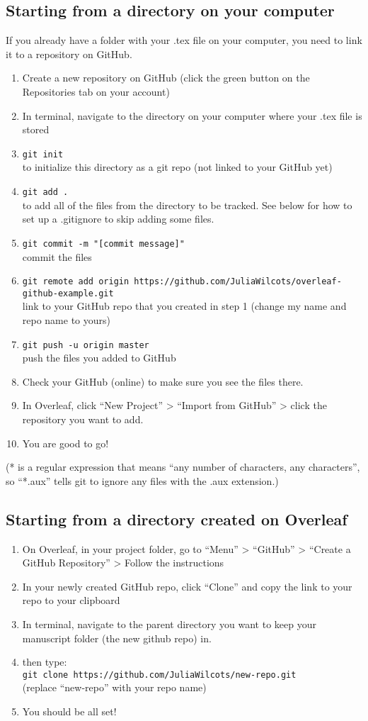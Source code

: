 \documentclass[10pt]{article}
\begin{document}
\subsection{Starting from a directory on your computer}
If you already have a folder with your .tex file on your computer, you need to link it to a repository on GitHub.
\begin{enumerate}
\item Create a new repository on GitHub (click the green button on the Repositories tab on your account)
\item In terminal, navigate to the directory on your computer where your .tex file is stored
\item \texttt{git init}\\ to initialize this directory as a git repo (not linked to your GitHub yet)
\item \texttt{git add .}\\ to add all of the files from the directory to be tracked. See below for how to set up a .gitignore to skip adding some files.
\item \texttt{git commit -m "[commit message]"}\\ commit the files
\item \texttt{git remote add origin https://github.com/JuliaWilcots/overleaf-github-example.git}\\ link to your GitHub repo that you created in step 1 (change my name and repo name to yours)
\item \texttt{git push -u origin master} \\push the files you added to GitHub
\item Check your GitHub (online) to make sure you see the files there.
\item In Overleaf, click ``New Project'' > ``Import from GitHub''  > click the repository you want to add.
\item You are good to go!
\end{enumerate}
(* is a regular expression that means ``any number of characters, any characters'', so ``*.aux'' tells git to ignore any files with the .aux extension.)

\subsection{Starting from a directory created on Overleaf}
\begin{enumerate}
\item On Overleaf, in your project folder, go to ``Menu'' > ``GitHub'' > ``Create a GitHub Repository'' > Follow the instructions
\item In your newly created GitHub repo, click ``Clone'' and copy the link to your repo to your clipboard
\item In terminal, navigate to the parent directory you want to keep your manuscript folder (the new github repo) in.
\item then type:\\ \texttt{git clone https://github.com/JuliaWilcots/new-repo.git} \\(replace ``new-repo'' with your repo name)
\item You should be all set!
\end{enumerate}
\end{document}
